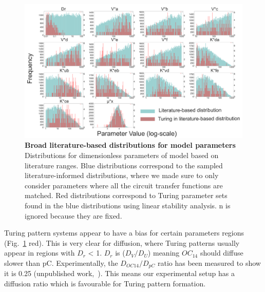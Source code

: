 \begin{figure}[H] %
    \centering
    \begin{adjustbox}{center}
        \includegraphics[width=1.2\textwidth]{chapters/Chapter 2/param_distributions} %
    \end{adjustbox}
    \caption{\textbf{Broad literature-based distributions for model parameters} Distributions for dimensionless parameters of model based on literature ranges.
    Blue distributions correspond to the sampled literature-informed distributions,
    where we made sure to only consider parameters where all the circuit transfer functions are matched.
    Red distributions correspond to Turing parameter sets found in the blue distributions using linear stability analysis.
    n is ignored because they are fixed.}%
    \label{fig:param_distributions_turing_vs_noturing} %
\end{figure}

Turing pattern systems appear to have a bias for certain parameters regions
(Fig.~\ref{fig:param_distributions_turing_vs_noturing} red).
This is very clear for diffusion, where Turing patterns usually appear in regions with $D_r$ < 1.
$D_r$ is ($D_V / D_U$) meaning $OC_{14}$ should diffuse slower than pC.
Experimentally, the $D_{OC14}/D_{pC}$ ratio has been measured to show it is 0.25 (unpublished work,~\cite{tica_diffusers}).
This means our experimental setup has a diffusion ratio which is favourable for Turing pattern formation.

